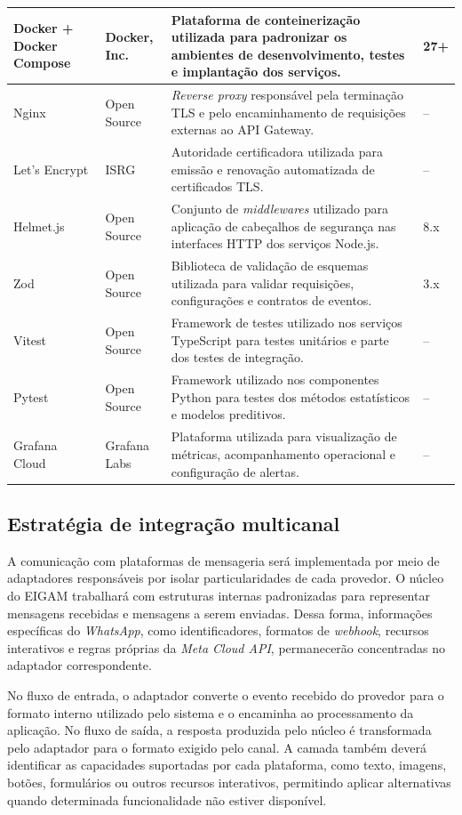 {\begin{longtable}{|p{3.2cm}|p{2.8cm}|p{6.7cm}|p{1.5cm}|}
Docker + Docker Compose & Docker, Inc. & Plataforma de conteinerização utilizada para padronizar os ambientes de desenvolvimento, testes e implantação dos serviços. & 27+ \\ \hline
Nginx & Open Source & \textit{Reverse proxy} responsável pela terminação TLS e pelo encaminhamento de requisições externas ao API Gateway. & -- \\ \hline
Let's Encrypt & ISRG & Autoridade certificadora utilizada para emissão e renovação automatizada de certificados TLS. & -- \\ \hline
Helmet.js & Open Source & Conjunto de \textit{middlewares} utilizado para aplicação de cabeçalhos de segurança nas interfaces HTTP dos serviços Node.js. & 8.x \\ \hline
Zod & Open Source & Biblioteca de validação de esquemas utilizada para validar requisições, configurações e contratos de eventos. & 3.x \\ \hline
Vitest & Open Source & Framework de testes utilizado nos serviços TypeScript para testes unitários e parte dos testes de integração. & -- \\ \hline
Pytest & Open Source & Framework utilizado nos componentes Python para testes dos métodos estatísticos e modelos preditivos. & -- \\ \hline
Grafana Cloud & Grafana Labs & Plataforma utilizada para visualização de métricas, acompanhamento operacional e configuração de alertas. & -- \\ \hline

\end{longtable}
}

\subsection{Estratégia de integração multicanal}

A comunicação com plataformas de mensageria será implementada por meio de adaptadores responsáveis por isolar particularidades de cada provedor. O núcleo do EIGAM trabalhará com estruturas internas padronizadas para representar mensagens recebidas e mensagens a serem enviadas. Dessa forma, informações específicas do \textit{WhatsApp}, como identificadores, formatos de \textit{webhook}, recursos interativos e regras próprias da \textit{Meta Cloud API}, permanecerão concentradas no adaptador correspondente.

No fluxo de entrada, o adaptador converte o evento recebido do provedor para o formato interno utilizado pelo sistema e o encaminha ao processamento da aplicação. No fluxo de saída, a resposta produzida pelo núcleo é transformada pelo adaptador para o formato exigido pelo canal. A camada também deverá identificar as capacidades suportadas por cada plataforma, como texto, imagens, botões, formulários ou outros recursos interativos, permitindo aplicar alternativas quando determinada funcionalidade não estiver disponível.

